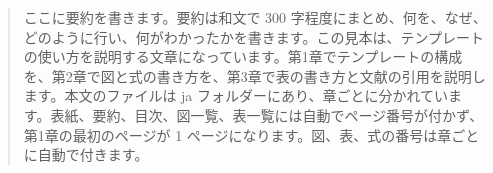 \begin{abstract}
ここに要約を書きます。要約は和文で 300 字程度にまとめ、何を、なぜ、どのように行い、何がわかったかを書きます。この見本は、テンプレートの使い方を説明する文章になっています。第1章でテンプレートの構成を、第2章で図と式の書き方を、第3章で表の書き方と文献の引用を説明します。本文のファイルは ja フォルダーにあり、章ごとに分かれています。表紙、要約、目次、図一覧、表一覧には自動でページ番号が付かず、第1章の最初のページが 1 ページになります。図、表、式の番号は章ごとに自動で付きます。
\end{abstract}
